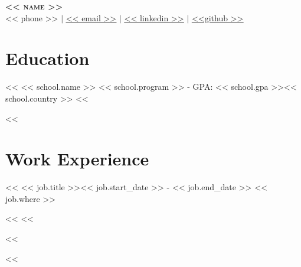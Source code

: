 \documentclass[letterpaper,11pt]{article}
\makeatletter
\newcommand{\resumeItem}[1]{
  \item\small{
    {#1 \vspace{-2pt}}
  }
}
\newcommand{\resumeSubheading}[4]{
  \vspace{-2pt}\item
    \begin{tabular*}{0.97\textwidth}[t]{l@{\extracolsep{\fill}}r}
      \textbf{#1} & #2 \\
      \textit{\small#3} & \textit{\small #4} \\
    \end{tabular*}\vspace{-7pt}
}
\newcommand{\resumeSubSubheading}[2]{
    \item
    \begin{tabular*}{0.97\textwidth}{l@{\extracolsep{\fill}}r}
      \textit{\small#1} & \textit{\small #2} \\
    \end{tabular*}\vspace{-7pt}
}
\newcommand{\resumeSubHeadingListStart}{\begin{itemize}[leftmargin=0.15in, label={}]}
\newcommand{\resumeSubHeadingListEnd}{\end{itemize}}
\newcommand{\resumeItemListStart}{\begin{itemize}}
\newcommand{\resumeItemListEnd}{\end{itemize}\vspace{-5pt}}
\makeatother
\begin{document}

\begin{center}
    \textbf{\Huge \scshape << name >> \\ \vspace{1pt}}
    \small << phone >> $|$ \href{mailto:x@x.com}{\underline{<< email >>}} $|$
    \href{https://linkedin.com/in/...}{\underline{<< linkedin >>}} $|$
    \href{https://github.com/...}{\underline{<<github >>}}
\end{center}


\section{Education}
  \resumeSubHeadingListStart

    <<%
    {<< school.name >>}{}
    {<< school.program >> - GPA: << school.gpa >>}{<< school.country >>}
    <<%
  \resumeSubHeadingListEnd


<<%
\section{Work Experience}
  \resumeSubHeadingListStart

    <<%
      {<< job.title >>}{<< job.start_date >> - << job.end_date >>}
      {<< job.where >>}{}
      \resumeItemListStart
        <<%
        <<%
      \resumeItemListEnd
    <<%
  \resumeSubHeadingListEnd
<<%
\end{document}
